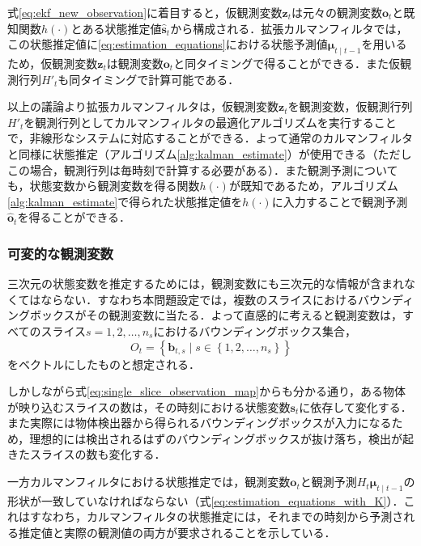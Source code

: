         式\ref{eq:ekf_new_observation}に着目すると，仮観測変数$\bm{z}_t$は元々の観測変数$\bm{o}_t$と既知関数$h(\cdot)$とある状態推定値$\hat{\bm{s}}_t$から構成される．拡張カルマンフィルタでは，この状態推定値に\ref{eq:estimation_equations}における状態予測値$\bm{\mu}_{t\mid t-1}$を用いるため，仮観測変数$\bm{z}_t$は観測変数$\bm{o}_t$と同タイミングで得ることができる．また仮観測行列$H'_t$も同タイミングで計算可能である．

        以上の議論より拡張カルマンフィルタは，仮観測変数$\bm{z}_t$を観測変数，仮観測行列$H'_t$を観測行列としてカルマンフィルタの最適化アルゴリズムを実行することで，非線形なシステムに対応することができる．よって通常のカルマンフィルタと同様に状態推定（アルゴリズム\ref{alg:kalman_estimate}）が使用できる（ただしこの場合，観測行列は毎時刻で計算する必要がある）．また観測予測についても，状態変数から観測変数を得る関数$h(\cdot)$が既知であるため，アルゴリズム\ref{alg:kalman_estimate}で得られた状態推定値を$h(\cdot)$に入力することで観測予測$\hat{\bm{o}}_t$を得ることができる．
        
            \subsubsection{可変的な観測変数}

            三次元の状態変数を推定するためには，観測変数にも三次元的な情報が含まれなくてはならない．すなわち本問題設定では，複数のスライスにおけるバウンディングボックスがその観測変数に当たる．よって直感的に考えると観測変数は，すべてのスライス$s=1,2,\dots, n_s$におけるバウンディングボックス集合，
            \begin{equation}
                \label{eq:naive_skf_observation}
                    O_t = \left\{\bm{b}_{t, s} \mid s \in \left\{1, 2, \dots, n_s\right\}\right\}
            \end{equation}
            をベクトルにしたものと想定される．
            
            しかしながら式\ref{eq:single_slice_observation_map}からも分かる通り，ある物体が映り込むスライスの数は，その時刻における状態変数$\bm{s}_t$に依存して変化する．また実際には物体検出器から得られるバウンディングボックスが入力になるため，理想的には検出されるはずのバウンディングボックスが抜け落ち，検出が起きたスライスの数も変化する．

            一方カルマンフィルタにおける状態推定では，観測変数$\bm{o}_t$と観測予測$H_t\bm{\mu}_{t \mid t-1}$の形状が一致していなければならない（式\ref{eq:estimation_equations_with_K}）．これはすなわち，カルマンフィルタの状態推定には，それまでの時刻から予測される推定値と実際の観測値の両方が要求されることを示している．

